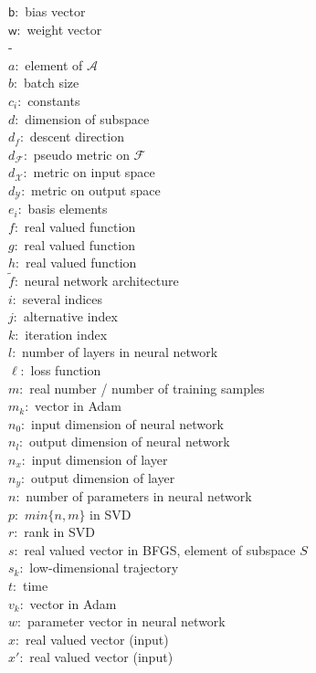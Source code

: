 \documentclass[11pt, a4paper]{article}
\newcommand{\A}{\mathcal{A}}
\newcommand{\F}{\mathcal{F}}
\newcommand{\X}{\mathcal{X}}
\newcommand{\Y}{\mathcal{Y}}
\renewcommand{\b}{\mathsf{b}}
\newcommand{\w}{\mathsf{w}}
\begin{document}
\pagebreak
$\b:$ bias vector \\
$\w:$ weight vector \\
- \\
$a:$ element of $\A$ \\
$b:$ batch size \\
$c_i:$ constants \\
$d:$ dimension of subspace \\
$d_f:$ descent direction \\
$d_{\F}:$ pseudo metric on $\F$ \\
$d_{\X}:$ metric on input space \\
$d_{\Y}:$ metric on output space \\
$e_i:$ basis elements \\
$f:$ real valued function \\
$g:$ real valued function \\
$h:$ real valued function \\
$\tilde{f}:$ neural network architecture \\
$i:$ several indices \\
$j:$ alternative index \\
$k:$ iteration index \\
$l:$ number of layers in neural network \\
$\ell:$ loss function \\
$m:$ real number / number of training samples \\
$m_k:$ vector in Adam \\
$n_0:$ input dimension of neural network \\
$n_l:$ output dimension of neural network \\
$n_x:$ input dimension of layer \\
$n_y:$ output dimension of layer \\
$n:$ number of parameters in neural network \\
$p:$ $min\{ n, m\}$ in SVD \\
$r:$ rank in SVD \\
$s:$ real valued vector in BFGS, element of subspace $S$ \\
$s_k:$ low-dimensional trajectory \\
$t:$ time \\
$v_k:$ vector in Adam \\
$w:$ parameter vector in neural network \\
$x:$ real valued vector (input) \\
$x':$ real valued vector (input) \\
\end{document}
